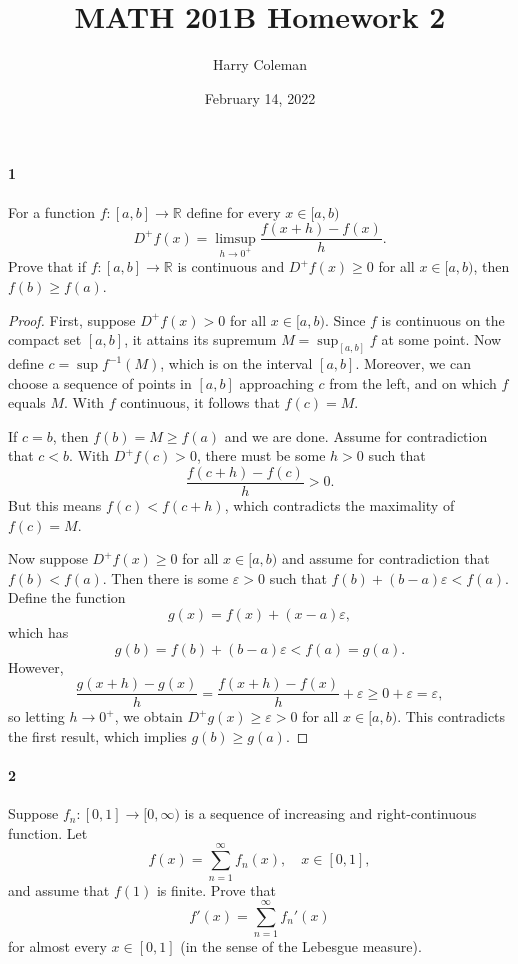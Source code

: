 \documentclass[12pt]{article}
\renewcommand{\maketitle}{\thispagestyle{title}}
\newlength{\myparskip}
\newenvironment{fullbox}{\begin{lrbox}{\savefullbox}\begin{minipage}{\dimexpr\textwidth-2\fboxsep\relax}\setlength{\parskip}{\myparskip}}{\end{minipage}\end{lrbox}\framebox[\textwidth]{\usebox{\savefullbox}}}
\newenvironment{pbox}[1][]{\begin{fullbox}\ifx#1\empty\else\paragraph{#1}\phantom{}\fi}{\end{fullbox}}
\theoremstyle{definition}
\newcommand{\R}{\mathbb{R}}
\newcommand{\eps}{\varepsilon}
\newcommand{\<}{\langle}
\renewcommand{\>}{\rangle}
\begin{document}
\title{MATH 201B Homework 2}
\author{Harry Coleman}
\date{February 14, 2022}
\maketitle

\begin{pbox}[1]
    For a function $f : [a, b] \to \R$ define for every $x \in [a, b)$
    \[
        D^+ f(x) = \limsup_{h \to 0^+} \frac{f(x + h) - f(x)}{h}.
    \]
    Prove that if $f : [a, b] \to \R$ is continuous and $D^+ f(x) \geq 0$ for all $x \in [a, b)$, then $f(b) \geq f(a)$.
\end{pbox}

\begin{proof}
    First, suppose $D^+f(x) > 0$ for all $x \in [a, b)$.
    Since $f$ is continuous on the compact set $[a, b]$, it attains its supremum $M = \sup_{[a, b]} f$ at some point.
    Now define $c = \sup f^{-1}(M)$, which is on the interval $[a, b]$.
    Moreover, we can choose a sequence of points in $[a, b]$ approaching $c$ from the left, and on which $f$ equals $M$.
    With $f$ continuous, it follows that $f(c) = M$.

    If $c = b$, then $f(b) = M \geq f(a)$ and we are done.
    Assume for contradiction that $c < b$.
    With $D^+f(c) > 0$, there must be some $h > 0$ such that
    \[
        \frac{f(c + h) - f(c)}{h} > 0.
    \]
    But this means $f(c) < f(c + h)$, which contradicts the maximality of $f(c) = M$.

    Now suppose $D^+f(x) \geq 0$ for all $x \in [a, b)$ and assume for contradiction that $f(b) < f(a)$.
    Then there is some $\eps > 0$ such that $f(b) + (b - a)\eps < f(a)$.
    Define the function
    \[
        g(x) = f(x) + (x - a)\eps,
    \]
    which has
    \[
        g(b) = f(b) + (b - a)\eps < f(a) = g(a).
    \]
    However,
    \[
        \frac{g(x + h) - g(x)}{h}
            = \frac{f(x + h) - f(x)}{h} + \eps
            \geq 0 + \eps
            = \eps,
    \]
    so letting $h \to 0^+$, we obtain $D^+g(x) \geq \eps > 0$ for all $x \in [a, b)$.
    This contradicts the first result, which implies $g(b) \geq g(a)$.
\end{proof}

\newpage
\begin{pbox}[2]
    Suppose $f_n : [0, 1] \to [0, \infty)$ is a sequence of increasing and right-continuous function.
    Let
    \[
        f(x) = \sum_{n=1}^{\infty} f_n(x), \quad x \in [0, 1],
    \]
    and assume that $f(1)$ is finite.
    Prove that
    \[
        f'(x) = \sum_{n=1}^{\infty} f_n'(x)
    \]
    for almost every $x \in [0, 1]$ (in the sense of the Lebesgue measure).
\end{pbox}
\end{document}
